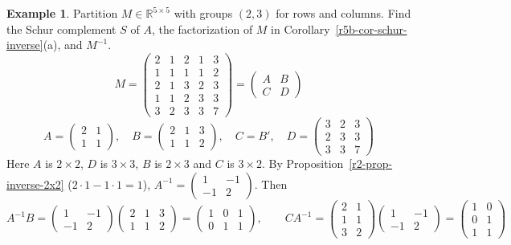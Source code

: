 \documentclass[12pt]{article}
\newcommand{\R}{\mathbb R}
\theoremstyle{definition}
\newtheorem{example}[theorem]{Example}
\begin{document}
\begin{example}\label{r5b-exm-schur}
Partition \(M\in\R^{5\times5}\) with groups \((2,3)\) for rows and columns. Find the Schur complement \(S\) of
\(A\), the factorization of \(M\) in Corollary~\ref{r5b-cor-schur-inverse}(a), and \(M^{-1}\).
\[
M=\left(\begin{array}{cc|ccc}2&1&2&1&3\\1&1&1&1&2\\\hline2&1&3&2&3\\1&1&2&3&3\\3&2&3&3&7\end{array}\right)
=\begin{pmatrix}A&B\\C&D\end{pmatrix}
\]
\[
A=\begin{pmatrix}2&1\\1&1\end{pmatrix},\quad B=\begin{pmatrix}2&1&3\\1&1&2\end{pmatrix},\quad C=B',\quad
D=\begin{pmatrix}3&2&3\\2&3&3\\3&3&7\end{pmatrix}
\]
Here \(A\) is \(2\times2\), \(D\) is \(3\times3\), \(B\) is \(2\times3\) and \(C\) is \(3\times2\).
By Proposition~\ref{r2-prop-inverse-2x2} (\(2\cdot1-1\cdot1=1\)),
\(A^{-1}=\left(\begin{smallmatrix}1&-1\\-1&2\end{smallmatrix}\right)\). Then
\[
A^{-1}B=\begin{pmatrix}1&-1\\-1&2\end{pmatrix}\begin{pmatrix}2&1&3\\1&1&2\end{pmatrix}=\begin{pmatrix}1&0&1\\0&1&1\end{pmatrix},\qquad
CA^{-1}=\begin{pmatrix}2&1\\1&1\\3&2\end{pmatrix}\begin{pmatrix}1&-1\\-1&2\end{pmatrix}=\begin{pmatrix}1&0\\0&1\\1&1\end{pmatrix}
\]
\end{example}
\end{document}
